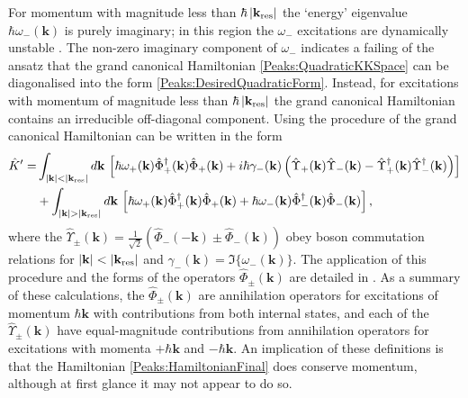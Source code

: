 For momentum with magnitude less than $\hbar \left|\mathbf{k}_\text{res}\right|$ the `energy' eigenvalue $\hbar \omega_-(\mathbf{k})$ is purely imaginary; in this region the $\omega_-$ excitations are dynamically unstable \citep{Leonhardt:2003}. The non-zero imaginary component of $\omega_-$ indicates a failing of the ansatz that the grand canonical Hamiltonian \eqref{Peaks:QuadraticKKSpace} can be diagonalised into the form \eqref{Peaks:DesiredQuadraticForm}. Instead, for excitations with momentum of magnitude less than $\hbar\left|\mathbf{k}_\text{res}\right|$ the grand canonical Hamiltonian contains an irreducible off-diagonal component. Using the procedure of \citep{Leonhardt:2003} the grand canonical Hamiltonian can be written in the form
\begin{align}
    \begin{split}
        \hat{K}' =& \int_{\abs{\mathbf{k}}<\abs{\mathbf{k}_\text{res}}} d\mathbf{k}\, \left[ \hbar\omega_+(\mathbf{k}) \hat{\Phi}_+^\dagger(\mathbf{k})\hat{\Phi}_+(\mathbf{k}) + i\hbar \gamma_-(\mathbf{k}) \left( \hat{\Upsilon}_+(\mathbf{k}) \hat{\Upsilon}_-(\mathbf{k}) - \hat{\Upsilon}_+^\dagger(\mathbf{k}) \hat{\Upsilon}_-^\dagger(\mathbf{k})\right)\right] \\
        & + \int_{\abs{\mathbf{k}}>\abs{\mathbf{k}_\text{res}}} d\mathbf{k}\, \left[ \hbar\omega_+(\mathbf{k}) \hat{\Phi}_+^\dagger(\mathbf{k})\hat{\Phi}_+(\mathbf{k}) + \hbar\omega_-(\mathbf{k}) \hat{\Phi}_-^\dagger(\mathbf{k}) \hat{\Phi}_-(\mathbf{k})\right],
    \end{split}
    \label{Peaks:HamiltonianFinal}
\end{align}
where the $\displaystyle\hat{\Upsilon}_\pm(\mathbf{k}) = \frac{1}{\sqrt{2}}\left(\hat{\Phi}_-(-\mathbf{k}) \pm \hat{\Phi}_-(\mathbf{k})\right)$ obey boson commutation relations for $\left|\mathbf{k}\right| < \left|\mathbf{k}_\text{res}\right|$ and $\gamma_-(\mathbf{k}) = \Im\{\omega_-(\mathbf{k})\}$. The application of this procedure and the forms of the operators $\hat{\Phi}_\pm(\mathbf{k})$ are detailed in . As a summary of these calculations, the $\hat{\Phi}_\pm(\mathbf{k})$ are annihilation operators for excitations of momentum $\hbar\mathbf{k}$ with contributions from both internal states, and each of the $\hat{\Upsilon}_\pm(\mathbf{k})$ have equal-magnitude contributions from annihilation operators for excitations with momenta $+\hbar\mathbf{k}$ and $-\hbar \mathbf{k}$. An implication of these definitions is that the Hamiltonian \eqref{Peaks:HamiltonianFinal} does conserve momentum, although at first glance it may not appear to do so.

